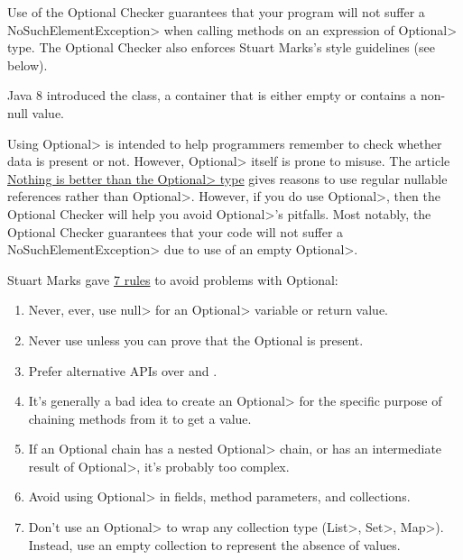 
Use of the Optional Checker guarantees that your program will not suffer
a \<NoSuchElementException> when calling
methods on an expression of \<Optional> type.
The Optional Checker also enforces Stuart Marks's style guidelines (see below).

Java 8 introduced the 
class, a container that is either empty or contains a non-null value.

Using \<Optional> is intended to help programmers remember to check whether
data is present or not.  However, \<Optional> itself is prone to misuse.
The article
\href{https://homes.cs.washington.edu/~mernst/advice/nothing-is-better-than-optional.html}{Nothing
  is better than the \<Optional> type} gives reasons to use
regular nullable references rather than \<Optional>.  However, if you do use
\<Optional>, then the Optional Checker will help you avoid
\<Optional>'s pitfalls.
Most notably, the Optional Checker guarantees that your code will not suffer a
\<NoSuchElementException> due to use of an empty \<Optional>.

Stuart Marks gave
\href{https://stuartmarks.wordpress.com/2016/09/27/vjug24-session-on-optional/}{7
  rules} to avoid problems with Optional:
\begin{enumerate}
\item
  Never, ever, use \<null> for an \<Optional> variable or return value.
\item
  Never use  unless you can prove that the Optional is present.
\item
  Prefer alternative APIs over
  and .
\item
  It's generally a bad idea to create an \<Optional> for the specific
  purpose of chaining methods from it to get a value.
\item
  If an Optional chain has a nested \<Optional> chain, or has an
  intermediate result of \<Optional>, it's probably too complex.
\item
  Avoid using \<Optional> in fields, method parameters, and collections.
\item
  Don't use an \<Optional> to wrap any collection type (\<List>, \<Set>,
  \<Map>).  Instead, use an empty collection to represent the absence of
  values.
\end{enumerate}


